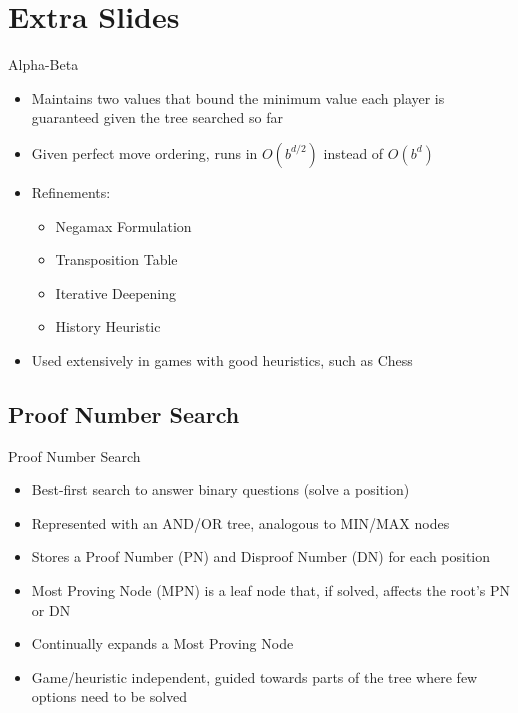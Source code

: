 \documentclass{beamer} %
\begin{document}


\section*{Extra Slides}

\begin{frame}{Alpha-Beta}
\begin{itemize}
	\item Maintains two values that bound the minimum value each player is guaranteed given the tree searched so far
	\item Given perfect move ordering, runs in $O(b^{d/2})$ instead of $O(b^d)$
	\item Refinements:
	\begin{itemize}
		\item Negamax Formulation
		\item Transposition Table
		\item Iterative Deepening
		\item History Heuristic
	\end{itemize}
	\item Used extensively in games with good heuristics, such as Chess
\end{itemize}
\end{frame}


\subsection*{Proof Number Search}

\begin{frame}{Proof Number Search}
\begin{itemize}
	\item Best-first search to answer binary questions (solve a position)
	\item Represented with an AND/OR tree, analogous to MIN/MAX nodes
	\item Stores a Proof Number (PN) and Disproof Number (DN) for each position
	\item Most Proving Node (MPN) is a leaf node that, if solved, affects the root's PN or DN
	\item Continually expands a Most Proving Node
	\item Game/heuristic independent, guided towards parts of the tree where few options need to be solved
\end{itemize}
\end{frame}
\end{document}
